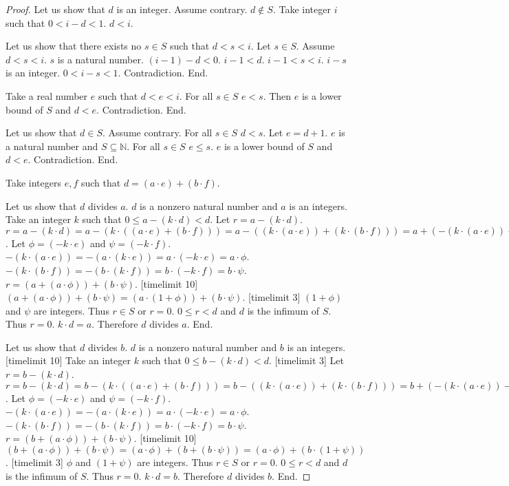 \documentclass{article}
\begin{document}
\begin{forthel}
\begin{proof}
  Let us show that $d$ is an integer.
    Assume contrary. $d \notin S$. Take integer $i$ such that $0 < i - d < 1$. $d < i$.

    Let us show that there exists no $s \in S$ such that $d < s < i$.
      Let $s \in S$. Assume $d < s < i$. $s$ is a natural number. 
      $(i-1) - d < 0$. $i-1 < d$. $i-1 < s < i$. $i-s$ is an integer. $0 < i-s < 1$. Contradiction. End.

    Take a real number $e$ such that $d < e < i$.
    For all $s \in S$ $e < s$.
    Then $e$ is a lower bound of $S$ and $d < e$. Contradiction. 
  End.
  
  Let us show that $d \in S$.
    Assume contrary. For all $s \in S$ $d < s$. Let $e = d+1$. $e$ is a natural number and $S \subseteq \mathbb{N}$.
    For all $s \in S$ $e \leq s$. $e$ is a lower bound of $S$ and $d < e$. Contradiction. End.

  Take integers $e,f$ such that $d = (a \cdot e) + (b \cdot f)$.

  Let us show that $d$ divides $a$.
    $d$ is a nonzero natural number and $a$ is an integers.
    Take an integer $k$ such that $0 \leq a - (k \cdot d) < d$. Let $r = a - (k \cdot d)$.
    $r = a - (k \cdot d) = a - (k \cdot ((a \cdot e) + (b \cdot f))) 
    = a - ((k \cdot (a \cdot e)) + (k \cdot (b \cdot f)))
    = a + (-(k \cdot (a \cdot e)) - (k \cdot (b \cdot f)))$.
    Let $\phi = (-k \cdot e)$ and $\psi = (-k \cdot f)$.
    $-(k \cdot (a \cdot e)) = -(a \cdot (k \cdot e)) = a \cdot (-k \cdot e) = a \cdot \phi$.
    $- (k \cdot (b \cdot f)) = -(b \cdot (k \cdot f)) = b \cdot (-k \cdot f) = b \cdot \psi$.
    $r = (a + (a \cdot \phi)) + (b \cdot \psi)$. [timelimit 10]
    $(a + (a \cdot \phi)) + (b \cdot \psi)= (a \cdot (1 + \phi)) + (b \cdot \psi)$. [timelimit 3]
    $(1 + \phi)$ and $\psi$ are integers. Thus $r \in S$ or $r = 0$. $0 \leq r < d$ and $d$ is the infimum of $S$.
    Thus $r = 0$. $k \cdot d = a$. Therefore $d$ divides $a$.
  End.

  Let us show that $d$ divides $b$.
    $d$ is a nonzero natural number and $b$ is an integers.
    [timelimit 10] Take an integer $k$ such that $0 \leq b - (k \cdot d) < d$. [timelimit 3] Let $r = b - (k \cdot d)$.
    $r = b - (k \cdot d) = b - (k \cdot ((a \cdot e) + (b \cdot f))) 
    = b - ((k \cdot (a \cdot e)) + (k \cdot (b \cdot f)))
    = b + (-(k \cdot (a \cdot e)) - (k \cdot (b \cdot f)))$.
    Let $\phi = (-k \cdot e)$ and $\psi = (-k \cdot f)$.
    $-(k \cdot (a \cdot e)) = -(a \cdot (k \cdot e)) = a \cdot (-k \cdot e) = a \cdot \phi$.
    $- (k \cdot (b \cdot f)) = -(b \cdot (k \cdot f)) = b \cdot (-k \cdot f) = b \cdot \psi$.
    $r = (b + (a \cdot \phi)) + (b \cdot \psi)$. [timelimit 10]
    $(b + (a \cdot \phi)) + (b \cdot \psi) = (a \cdot \phi) + (b + (b \cdot \psi)) = (a \cdot \phi) + (b \cdot (1 + \psi))$. [timelimit 3]
    $\phi$ and $(1+\psi)$ are integers. Thus $r \in S$ or $r = 0$. $0 \leq r < d$ and $d$ is the infimum of $S$.
    Thus $r = 0$. $k \cdot d = b$. Therefore $d$ divides $b$.
  End.



\end{proof}
\end{forthel}
\end{document}
